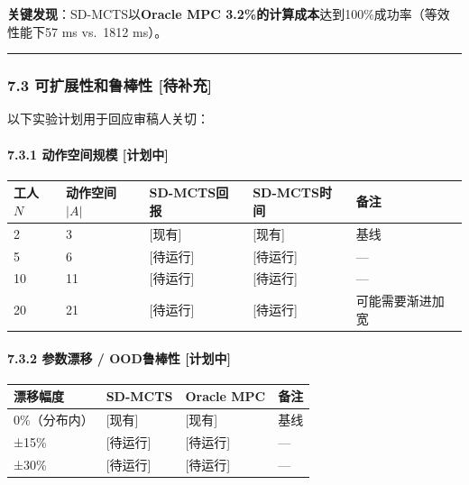 \documentclass[UTF8]{ctexart}
\let\oldparagraph\paragraph
\renewcommand{\paragraph}[1]{\oldparagraph{#1}\mbox{}}
\begin{document}
\textbf{关键发现}：SD-MCTS以\textbf{Oracle MPC
3.2\%的计算成本}达到100\%成功率（等效性能下57 ms vs.~1812 ms）。

\begin{center}\rule{0.5\linewidth}{0.4pt}\end{center}

\hypertarget{ux53efux6269ux5c55ux6027ux548cux9c81ux68d2ux6027-ux5f85ux8865ux5145}{%
\subsubsection{7.3 可扩展性和鲁棒性
{[}待补充{]}}\label{ux53efux6269ux5c55ux6027ux548cux9c81ux68d2ux6027-ux5f85ux8865ux5145}}

以下实验计划用于回应审稿人关切：

\hypertarget{ux52a8ux4f5cux7a7aux95f4ux89c4ux6a21-ux8ba1ux5212ux4e2d}{%
\paragraph{7.3.1 动作空间规模
{[}计划中{]}}\label{ux52a8ux4f5cux7a7aux95f4ux89c4ux6a21-ux8ba1ux5212ux4e2d}}

\begin{table}[h]
\centering
\begin{tabular}{p{2cm}p{3cm}p{3.5cm}p{3.5cm}p{3cm}}
\toprule
\textbf{工人 \(N\)} & \textbf{动作空间 \(|A|\)} & \textbf{SD-MCTS回报} & \textbf{SD-MCTS时间} & \textbf{备注} \\
\midrule
2 & 3 & [现有] & [现有] & 基线 \\
5 & 6 & [待运行] & [待运行] & --- \\
10 & 11 & [待运行] & [待运行] & --- \\
20 & 21 & [待运行] & [待运行] & 可能需要渐进加宽 \\
\bottomrule
\end{tabular}
\end{table}

\hypertarget{ux53c2ux6570ux6f02ux79fb-oodux9c81ux68d2ux6027-ux8ba1ux5212ux4e2d}{%
\paragraph{7.3.2 参数漂移 / OOD鲁棒性
{[}计划中{]}}\label{ux53c2ux6570ux6f02ux79fb-oodux9c81ux68d2ux6027-ux8ba1ux5212ux4e2d}}

\begin{table}[h]
\centering
\begin{tabular}{p{3cm}p{3.5cm}p{3.5cm}p{4cm}}
\toprule
\textbf{漂移幅度} & \textbf{SD-MCTS} & \textbf{Oracle MPC} & \textbf{备注} \\
\midrule
0\%（分布内） & [现有] & [现有] & 基线 \\
±15\% & [待运行] & [待运行] & --- \\
±30\% & [待运行] & [待运行] & --- \\
\bottomrule
\end{tabular}
\end{table}
\end{document}
